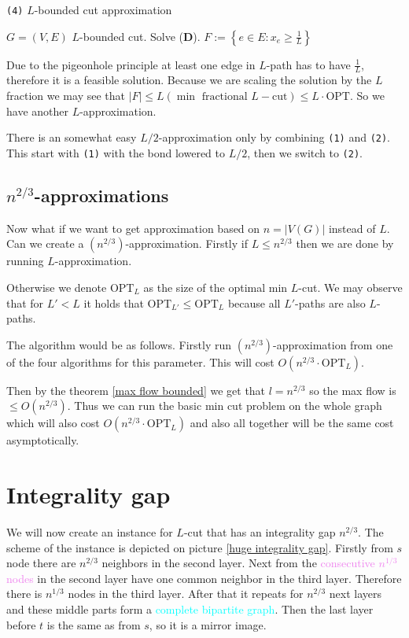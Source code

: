\begin{algorithm}
	\caption{ \texttt{(4)} $L$-bounded cut approximation}
	\begin{algorithmic}[1]
		\Require $G = (V,E)$
		\Ensure $L$-bounded cut.
		\State Solve (\textbf{D}).
		\State $F := \left\{e \in E: x_e \geq \frac{1}{L}\right\}$
	\end{algorithmic}
\end{algorithm}

Due to the pigeonhole principle at least one edge in $L$-path has to have $\frac{1}{L}$, therefore it is a feasible solution. Because we are scaling the solution by the $L$ fraction we may see that $|F| \leq L (\min \text{ fractional } L-\text{cut}) \leq L \cdot \text{OPT}$. So we have another $L$-approximation.

There is an somewhat easy $L/2$-approximation only by combining \texttt{(1)} and \texttt{(2)}. This start with \texttt{(1)} with the bond lowered to $L/2$, then we switch to \texttt{(2)}.

\subsection{$n^{2/3}$-approximations}

Now what if we want to get approximation based on $n = |V(G)|$ instead of $L$. Can we create a $(n^{2/3})$-approximation. Firstly if $L \leq n^{2/3}$ then we are done by running $L$-approximation.

Otherwise we denote $\text{OPT}_L$ as the size of the optimal min $L$-cut. We may observe that for $L' < L$ it holds that $\text{OPT}_{L'} \leq \text{OPT}_L$ because all $L'$-paths are also $L$-paths.

The algorithm would be as follows. Firstly run $(n^{2/3})$-approximation from one of the four algorithms for this parameter. This will cost $O(n^{2/3} \cdot \text{OPT}_L)$.

Then by the theorem \ref{max flow bounded} we get that $l = n^{2/3}$ so the max flow is $\leq O(n^{2/3})$. Thus we can run the basic min cut problem on the whole graph which will also cost $O(n^{2/3} \cdot \text{OPT}_L)$ and also all together will be the same cost asymptotically.

\section{Integrality gap}

We will now create an instance for $L$-cut that has an integrality gap $n^{2/3}$. The scheme of the instance is depicted on picture \ref{huge integrality gap}. Firstly from $s$ node there are $n^{2/3}$ neighbors in the second layer. Next from the \textcolor{violet}{consecutive $n^{1/3}$ nodes} in the second layer have one common neighbor in the third layer. Therefore there is $n^{1/3}$ nodes in the third layer. After that it repeats for $n^{2/3}$ next layers and these middle parts form a \textcolor{cyan}{complete bipartite graph}. Then the last layer before $t$ is the same as from $s$, so it is a mirror image.

